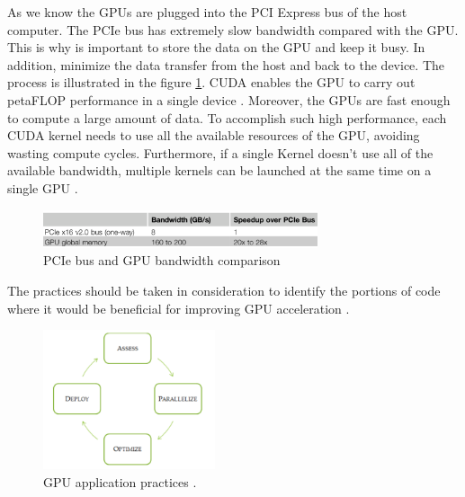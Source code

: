 As we know the GPUs are plugged into the PCI Express bus of the host computer. The PCIe bus has extremely slow bandwidth compared with the GPU. This is why is important to store the data on the GPU and keep it busy. In addition, minimize the data transfer from the host and back to the device. The process is illustrated in the figure \ref{fig:PCI}. CUDA enables the GPU to carry out petaFLOP performance in a single device \cite{cook}. Moreover, the GPUs are fast enough to compute a large amount of data. To accomplish such high performance, each CUDA kernel needs to use all the available resources of the GPU, avoiding wasting compute cycles. Furthermore, if a single Kernel doesn't use all of the available bandwidth, multiple kernels can be launched at the same time on a single GPU \cite{design}.

\begin{figure}[htbp]
	\centering
		\includegraphics[width=0.72\textwidth]{Figures/PCI.png}
		\smallskip
	\caption[PCIe Bandwidth]{PCIe bus and GPU bandwidth comparison \cite{cook}}
	\label{fig:PCI}
\end{figure}

The practices should be taken in consideration to identify the portions of code where it would be beneficial for improving GPU acceleration \cite{practices}.

\begin{figure}[htbp]
	\centering
		\includegraphics[width=0.45\textwidth]{Figures/apod.png}
		\smallskip
	\caption[GPU application practices]{GPU application practices \cite{practices}.}
	\label{fig:apod}
\end{figure}

